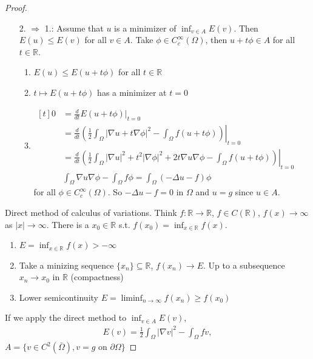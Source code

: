 \documentclass{report}
\theoremstyle{tommy}
\begin{document}
\begin{proof}
\begin{itemize}
      \item[2. \(\Rightarrow\) 1.:] Assume that \(u\) is a minimizer of \(\inf_{v \in A} E(v)\). Then \(E(u) \le E(v)\) for all \(v \in A\). Take \(\phi \in C_c^\infty(\Omega)\), then \(u + t \phi \in A\) for all \(t \in \mathbb{R}\).
      \begin{enumerate}[label=\(\Rightarrow\)]
        \item \(E(u) \le E(u + t \phi)\) for all \(t \in \mathbb{R}\)
        \item \(t \mapsto E(u + t \phi)\) has a minimizer at \(t = 0\)
        \item \(\begin{aligned}[t]
          0 &= \frac{d}{dt} E(u + t \phi)|_{t = 0}  \\
          &= \frac{d}{dt}\left. \left(\frac{1}{2} \int_\Omega|\nabla u + t \nabla \phi|^2 - \int_{\Omega} f(u + t \phi)\right)\right|_{t=0} \\
          &= \frac{d}{dt} \left. \left(\frac{1}{2} \int_\Omega |\nabla u|^2 + t^2 |\nabla \phi|^2 + 2 t \nabla u \nabla \phi - \int_{\Omega} f(u + t \phi)\right)\right|_{t=0} \\
          &\int_\Omega \nabla u \nabla \phi - \int_\Omega f \phi = \int_\Omega (- \Delta u - f) \phi
        \end{aligned}\) \\
        for all \(\phi \in C_c^\infty(\Omega)\). So \(- \Delta u - f = 0\) in \(\Omega\) and \(u = g\) since \(u \in A\).
      \end{enumerate}
    \end{itemize}
    
    Direct method of calculus of variations. Think \(f: \mathbb{R} \to \mathbb{R}\), \(f \in C(\mathbb{R})\), \(f(x) \to \infty\) as \(|x| \to \infty\). There is a \(x_0 \in \mathbb{R}\) s.t. \(f(x_0) = \inf_{x \in\mathbb{R}} f(x)\).
    \begin{enumerate}[label=Step \arabic*:]
      \item \(E = \inf_{x \in \mathbb{R}} f(x) > - \infty\)
      \item Take a minizing sequence \(\{x_n\} \subseteq \mathbb{R}\), \(f(x_n) \to E\). Up to a subsequence \(x_n \to x_0\) in \(\mathbb{R}\) (compactness)
      \item Lower semicontinuity \(E = \liminf_{n \to \infty} f(x_n) \ge f(x_0)\)
    \end{enumerate}
    If we apply the direct method to \(\inf_{v \in A}E(v)\), 
    \begin{align*}
      E(v) = \frac{1}{2} \int_{\Omega} |\nabla v|^2 - \int_\Omega f v,
    \end{align*}
    \(A = \{v \in C^2(\bar \Omega), v=g \text{ on } \partial \Omega\}\)


\end{proof}
\end{document}
